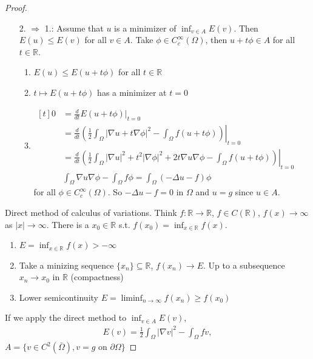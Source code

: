 \documentclass{report}
\theoremstyle{tommy}
\begin{document}
\begin{proof}
\begin{itemize}
      \item[2. \(\Rightarrow\) 1.:] Assume that \(u\) is a minimizer of \(\inf_{v \in A} E(v)\). Then \(E(u) \le E(v)\) for all \(v \in A\). Take \(\phi \in C_c^\infty(\Omega)\), then \(u + t \phi \in A\) for all \(t \in \mathbb{R}\).
      \begin{enumerate}[label=\(\Rightarrow\)]
        \item \(E(u) \le E(u + t \phi)\) for all \(t \in \mathbb{R}\)
        \item \(t \mapsto E(u + t \phi)\) has a minimizer at \(t = 0\)
        \item \(\begin{aligned}[t]
          0 &= \frac{d}{dt} E(u + t \phi)|_{t = 0}  \\
          &= \frac{d}{dt}\left. \left(\frac{1}{2} \int_\Omega|\nabla u + t \nabla \phi|^2 - \int_{\Omega} f(u + t \phi)\right)\right|_{t=0} \\
          &= \frac{d}{dt} \left. \left(\frac{1}{2} \int_\Omega |\nabla u|^2 + t^2 |\nabla \phi|^2 + 2 t \nabla u \nabla \phi - \int_{\Omega} f(u + t \phi)\right)\right|_{t=0} \\
          &\int_\Omega \nabla u \nabla \phi - \int_\Omega f \phi = \int_\Omega (- \Delta u - f) \phi
        \end{aligned}\) \\
        for all \(\phi \in C_c^\infty(\Omega)\). So \(- \Delta u - f = 0\) in \(\Omega\) and \(u = g\) since \(u \in A\).
      \end{enumerate}
    \end{itemize}
    
    Direct method of calculus of variations. Think \(f: \mathbb{R} \to \mathbb{R}\), \(f \in C(\mathbb{R})\), \(f(x) \to \infty\) as \(|x| \to \infty\). There is a \(x_0 \in \mathbb{R}\) s.t. \(f(x_0) = \inf_{x \in\mathbb{R}} f(x)\).
    \begin{enumerate}[label=Step \arabic*:]
      \item \(E = \inf_{x \in \mathbb{R}} f(x) > - \infty\)
      \item Take a minizing sequence \(\{x_n\} \subseteq \mathbb{R}\), \(f(x_n) \to E\). Up to a subsequence \(x_n \to x_0\) in \(\mathbb{R}\) (compactness)
      \item Lower semicontinuity \(E = \liminf_{n \to \infty} f(x_n) \ge f(x_0)\)
    \end{enumerate}
    If we apply the direct method to \(\inf_{v \in A}E(v)\), 
    \begin{align*}
      E(v) = \frac{1}{2} \int_{\Omega} |\nabla v|^2 - \int_\Omega f v,
    \end{align*}
    \(A = \{v \in C^2(\bar \Omega), v=g \text{ on } \partial \Omega\}\)


\end{proof}
\end{document}
